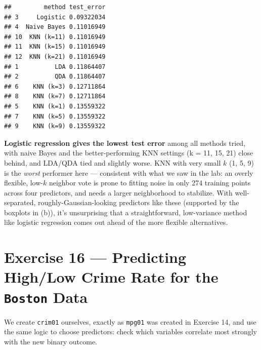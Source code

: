 \documentclass[
  11pt,
]{article}
\newenvironment{Shaded}{\begin{snugshade}}{\end{snugshade}}
\newcommand{\FunctionTok}[1]{\textcolor[rgb]{0.13,0.29,0.53}{\textbf{#1}}}
\newcommand{\NormalTok}[1]{#1}
\newcommand{\OtherTok}[1]{\textcolor[rgb]{0.56,0.35,0.01}{#1}}
\newcommand{\SpecialCharTok}[1]{\textcolor[rgb]{0.81,0.36,0.00}{\textbf{#1}}}
\begin{document}
\begin{verbatim}
##         method test_error
## 3     Logistic 0.09322034
## 4  Naive Bayes 0.11016949
## 10  KNN (k=11) 0.11016949
## 11  KNN (k=15) 0.11016949
## 12  KNN (k=21) 0.11016949
## 1          LDA 0.11864407
## 2          QDA 0.11864407
## 6    KNN (k=3) 0.12711864
## 8    KNN (k=7) 0.12711864
## 5    KNN (k=1) 0.13559322
## 7    KNN (k=5) 0.13559322
## 9    KNN (k=9) 0.13559322
\end{verbatim}

\textbf{Logistic regression gives the lowest test error} among all
methods tried, with naive Bayes and the better-performing KNN settings
(k = 11, 15, 21) close behind, and LDA/QDA tied and slightly worse. KNN
with very small \(k\) (1, 5, 9) is the \emph{worst} performer here ---
consistent with what we saw in the lab: an overly flexible, low-\(k\)
neighbor vote is prone to fitting noise in only 274 training points
across four predictors, and needs a larger neighborhood to stabilize.
With well-separated, roughly-Gaussian-looking predictors like these
(supported by the boxplots in (b)), it's unsurprising that a
straightforward, low-variance method like logistic regression comes out
ahead of the more flexible alternatives.

\newpage

\section{\texorpdfstring{Exercise 16 --- Predicting High/Low Crime Rate
for the \texttt{Boston}
Data}{Exercise 16 --- Predicting High/Low Crime Rate for the Boston Data}}\label{exercise-16-predicting-highlow-crime-rate-for-the-boston-data}

\begin{Shaded}
\end{Shaded}

We create \texttt{crim01} ourselves, exactly as \texttt{mpg01} was
created in Exercise 14, and use the same logic to choose predictors:
check which variables correlate most strongly with the new binary
outcome.
\end{document}
